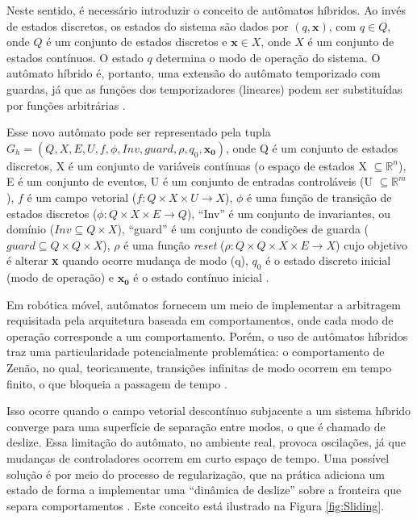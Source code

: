  

Neste sentido, é necessário introduzir o conceito de autômatos híbridos. Ao
invés de estados discretos, os estados do sistema são dados por
$(q,\mathbf{x})$, com $q \in Q$, onde $Q$ é um conjunto de estados discretos e
$\mathbf{x} \in X$, onde $X$ é um conjunto de estados contínuos. O estado $q$
determina o modo de operação do sistema. O autômato híbrido é, portanto, uma extensão do
autômato temporizado com guardas, já que as funções dos temporizadores
(lineares) podem ser substituídas por funções arbitrárias \cite{book:SED}.

Esse novo autômato pode ser representado pela tupla $G_h = (Q, X,
E, U, f, \phi, Inv, guard, \rho, q_0, \mathbf{x_0})$, onde Q é um conjunto de
estados discretos, X é um conjunto de variáveis contínuas (o espaço de estados
X $\subseteq \mathbb{R}^n$), E é um conjunto de eventos, U é um conjunto de
entradas controláveis (U $\subseteq \mathbb{R}^m$), $f$ é um campo vetorial
($f: Q \times X \times U \rightarrow X$), $\phi$ é uma função de transição de
estados discretos ($\phi: Q \times X \times E \rightarrow Q$), ``Inv'' é um
conjunto de invariantes, ou domínio ($Inv \subseteq Q \times X$), ``guard'' é um
conjunto de condições de guarda ($guard \subseteq Q \times Q \times X$), $\rho$
é uma função \textit{reset} ($\rho: Q \times Q \times X \times E \rightarrow
X$) cujo objetivo é alterar \textbf{x} quando ocorre mudança de modo (q), $q_0$
é o estado discreto inicial (modo de operação) e $\mathbf{x_0}$ é o estado
contínuo inicial \cite[pg. 316]{book:SED}.

Em robótica móvel, autômatos fornecem um meio de implementar a arbitragem
requisitada pela arquitetura baseada em comportamentos, onde cada modo de
operação corresponde a um comportamento. Porém, o uso de autômatos híbridos
traz uma particularidade potencialmente problemática: o comportamento de
Zenão, no qual, teoricamente, transições infinitas de modo ocorrem em tempo finito, o que
bloqueia a passagem de tempo \cite{art:Magnus_Behavior}.

Isso ocorre quando o campo vetorial descontínuo subjacente a um sistema híbrido
converge para uma superfície de separação entre modos, o que é chamado de
deslize. Essa limitação do autômato, no ambiente real, provoca oscilações, já
que mudanças de controladores ocorrem em curto espaço de tempo. Uma possível
solução é por meio do processo de regularização, que na prática adiciona um
estado de forma a implementar uma ``dinâmica de deslize'' sobre a fronteira que
separa comportamentos \cite{art:Magnus_Behavior}. Este conceito está ilustrado
na Figura \ref{fig:Sliding}.

